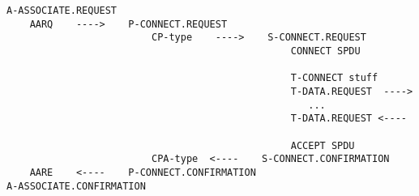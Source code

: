 \begin{bwslide}

\scriptsize
\begin{verbatim}
A-ASSOCIATE.REQUEST
    AARQ    ---->    P-CONNECT.REQUEST
                         CP-type    ---->    S-CONNECT.REQUEST
                                                 CONNECT SPDU

                                                 T-CONNECT stuff
                                                 T-DATA.REQUEST  ---->
                                                    ...
                                                 T-DATA.REQUEST <----

                                                 ACCEPT SPDU
                         CPA-type  <----    S-CONNECT.CONFIRMATION
    AARE    <----    P-CONNECT.CONFIRMATION
A-ASSOCIATE.CONFIRMATION
\end{verbatim}
\end{bwslide}



